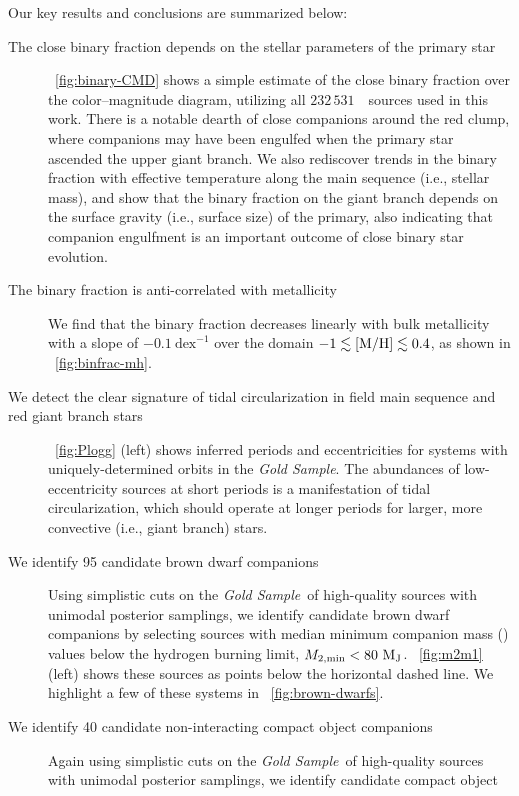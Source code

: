 \documentclass[modern]{aastex63}
\newcommand{\nsources}{\ensuremath{232\,531}}
\newcommand{\goldsample}{\textit{Gold Sample}}
\begin{document}
Our key results and conclusions are summarized below:
\begin{description}
    \item[The close binary fraction depends on the stellar parameters of the
    primary star] \figurename~\ref{fig:binary-CMD} shows a simple estimate of
    the close binary fraction over the color--magnitude diagram, utilizing all
    \nsources\ \apogee\ sources used in this work. There is a notable dearth of
    close companions around the red clump, where companions may have been
    engulfed when the primary star ascended the upper giant branch. We also
    rediscover trends in the binary fraction with effective temperature along
    the main sequence (i.e., stellar mass), and show that the binary fraction on
    the giant branch depends on the surface gravity (i.e., surface size) of the
    primary, also indicating that companion engulfment is an important outcome
    of close binary star evolution.
    \item[The binary fraction is anti-correlated with metallicity] We find that
    the binary fraction decreases linearly with bulk metallicity with a slope of
    $-0.1~\textrm{dex}^{-1}$ over the domain $-1 \lesssim {[{\rm M}/{\rm H}]} \lesssim 0.4$, as
    shown in \figurename~\ref{fig:binfrac-mh}.
    \item[We detect the clear signature of tidal circularization in field main
    sequence and red giant branch stars] \figurename~\ref{fig:Plogg} (left)
    shows inferred periods and eccentricities for systems with
    uniquely-determined orbits in the \goldsample.
    The abundances of low-eccentricity sources at short periods is a
    manifestation of tidal circularization, which should operate at longer
    periods for larger, more convective (i.e., giant branch) stars.
    \item[We identify 95 candidate brown dwarf companions] Using simplistic cuts
    on the \goldsample\ of high-quality sources with unimodal posterior
    samplings, we identify candidate brown dwarf companions by selecting sources
    with median minimum companion mass (\mtwomin) values below the hydrogen
    burning limit, $M_{2, {\rm min}} < 80~\mathrm{M}_{\mathrm{J}}$. \figurename~\ref{fig:m2m1} (left)
    shows these sources as points below the horizontal dashed line. We highlight
    a few of these systems in \figurename~\ref{fig:brown-dwarfs}.
    \item[We identify 40 candidate non-interacting compact object companions]
    Again using simplistic cuts on the \goldsample\ of high-quality sources with
    unimodal posterior samplings, we identify candidate compact object

\end{description}
\end{document}
